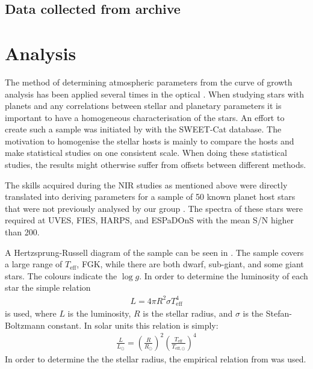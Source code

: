 \subsection{Data collected from archive}



\section{Analysis}
\label{sec:sweetcat_analysis}

The method of determining atmospheric parameters from the curve of growth analysis has been applied
several times in the optical \citep[see e.g.][]{Mortier2013b,Tsantaki2013,Sousa2011,Santos2013}.
When studying stars with planets and any correlations between stellar and planetary parameters it is
important to have a homogeneous characterisation of the stars. An effort to create such a sample was
initiated by \citet{Santos2013} with the SWEET-Cat database. The motivation to homogenise the
stellar hosts is mainly to compare the hosts and make statistical studies on one consistent scale.
When doing these statistical studies, the results might otherwise suffer from offsets between
different methods.

The skills acquired during the NIR studies as mentioned above were directly translated into deriving
parameters for a sample of 50 known planet host stars that were not previously analysed by our group
\citep{Andreasen2017a}. The spectra of these stars were required at UVES, FIES, HARPS, and ESPaDOnS
with the mean S/N higher than 200.

A Hertzsprung-Russell diagram of the sample can be seen in . The sample covers a
large range of $T_\mathrm{eff}$, FGK, while there are both dwarf, sub-giant, and some giant stars.
The colours indicate the $\log g$. In order to determine the luminosity of each star the simple
relation
\begin{align*}
  L = 4\pi R^2 \sigma T^4_\mathrm{eff}
\end{align*}
is used, where $L$ is the luminosity, $R$ is the stellar radius, and $\sigma$ is the
Stefan-Boltzmann constant. In solar units this relation is simply:
\begin{align*}
  \frac{L}{L_\odot} = \left(\frac{R}{R_\odot}\right)^2 \left(\frac{T_\mathrm{eff}}{T_{\mathrm{eff},\odot}}\right)^4
\end{align*}
In order to determine the the stellar radius, the empirical relation from \citet{Torres2010} was
used.

